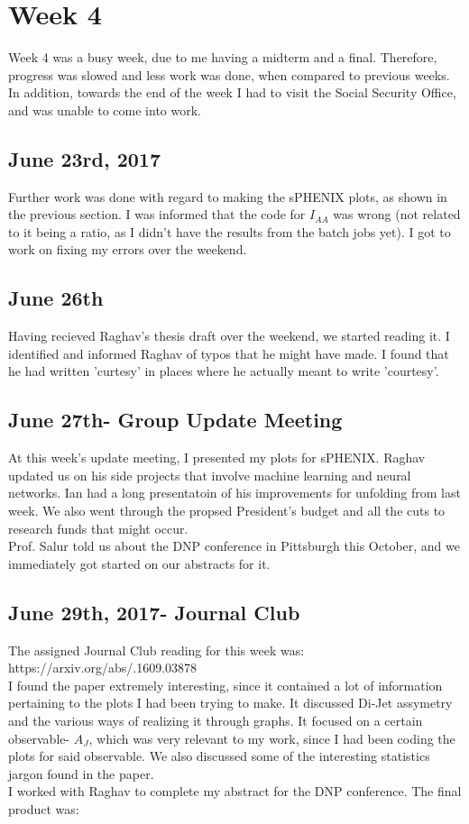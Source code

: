 \documentclass{article}
\begin{document}
\section{Week 4}
Week 4 was a busy week, due to me having a midterm and a final. Therefore, progress was slowed and less work was done, when compared to previous weeks. In addition, towards the end of the week I had to  visit the Social Security Office, and was unable to come into work.

\subsection{June 23rd, 2017}
Further work was done with regard to making the sPHENIX plots, as shown in the previous section. I was informed that the code for $I_{AA}$ was wrong (not related to it being a ratio, as I didn't have the results from the batch jobs yet). I got to work on fixing my errors over the weekend.

\subsection{June 26th}
Having recieved Raghav's thesis draft over the weekend, we started reading it. I identified and informed Raghav of typos that he might have made. I found that he had written 'curtesy' in places where he actually meant to write 'courtesy'.

\subsection{June 27th- Group Update Meeting}
At this week's update meeting, I presented my plots for sPHENIX.
Raghav updated us on his side projects that involve machine learning and neural networks. Ian had a long presentatoin of his improvements for unfolding from last week.
We also went through the propsed President's budget and all the cuts to research funds that might occur.
\\
Prof. Salur told us about the DNP conference in Pittsburgh this October, and we immediately got started on our abstracts for it.

\subsection{June 29th, 2017- Journal Club}
The assigned Journal Club reading for this week was: https://arxiv.org/abs/.1609.03878\\ I found the paper extremely interesting, since it contained a lot of information pertaining to the plots I had been trying to make. It discussed Di-Jet assymetry and the various ways of realizing it through graphs. It focused on a certain observable- $A_{J}$, which was very relevant to my work, since I had been coding the plots for said observable. We also discussed some of the interesting statistics jargon found in the paper.\\
I worked with Raghav to complete my abstract for the DNP conference. The final product was:
\end{document}
